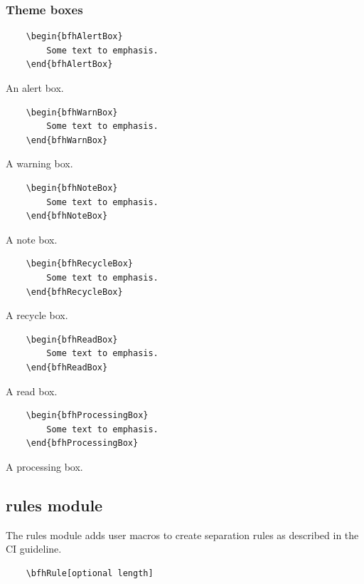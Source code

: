 \documentclass[
]{bfhpub}				%
\begin{document}
\subsubsection{Theme boxes}

\begin{verbatim}
	\begin{bfhAlertBox}
		Some text to emphasis.
	\end{bfhAlertBox}
\end{verbatim}

\begin{bfhAlertBox}
	An alert box.
\end{bfhAlertBox}

\begin{verbatim}
	\begin{bfhWarnBox}
		Some text to emphasis.
	\end{bfhWarnBox}
\end{verbatim}

\begin{bfhWarnBox}
	A warning box.
\end{bfhWarnBox}

\begin{verbatim}
	\begin{bfhNoteBox}
		Some text to emphasis.
	\end{bfhNoteBox}
\end{verbatim}

\begin{bfhNoteBox}
	A note box.
\end{bfhNoteBox}

\begin{verbatim}
	\begin{bfhRecycleBox}
		Some text to emphasis.
	\end{bfhRecycleBox}
\end{verbatim}

\begin{bfhRecycleBox}
	A recycle box.
\end{bfhRecycleBox}

\begin{verbatim}
	\begin{bfhReadBox}
		Some text to emphasis.
	\end{bfhReadBox}
\end{verbatim}

\begin{bfhReadBox}
	A read box.
\end{bfhReadBox}


\begin{verbatim}
	\begin{bfhProcessingBox}
		Some text to emphasis.
	\end{bfhProcessingBox}
\end{verbatim}

\begin{bfhProcessingBox}
	A processing box.
\end{bfhProcessingBox}

\subsection{rules module}
The rules module adds user macros to create separation rules as described in the CI guideline.

\begin{verbatim}
	\bfhRule[optional length]
\end{verbatim}

\bfhRule
\end{document}
